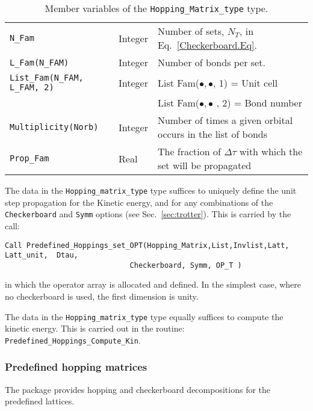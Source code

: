 \begin{table}[h]
\begin{tabular}{@{} l l l @{}}
      \texttt{N\_Fam}                &  Integer  &      Number of  sets, $N_T$, in Eq.~\eqref{Checkerboard.Eq}.   \\
      \texttt{L\_Fam(N\_FAM)}  &  Integer &       Number of bonds per  set.   \\    
      \texttt{List\_Fam(N\_FAM, L\_FAM, 2)}     &  Integer  &   List Fam($ \bullet,\bullet $, 1) =  Unit cell \\
                                              &                        &          List Fam($\bullet,\bullet$ , 2) =   Bond number \\
       \texttt{Multiplicity(Norb)} & Integer           &        Number of  times a  given orbital  occurs in the list of bonds  \\
       \texttt{Prop\_Fam} &  Real            &         The fraction of $ \Delta \tau $   with which the set will be propagated   \                                
        \\\bottomrule
   \end{tabular}
   \caption{Member variables of the \texttt{Hopping\_Matrix\_type}  type.   
    \label{table:Hopping_matrix}}
\end{table}

The  data in the \texttt{Hopping\_matrix\_type} type suffices to uniquely define the  unit step propagation    for the Kinetic energy, and for  any combinations of the  \texttt{Checkerboard} and  \texttt{Symm}  options (see Sec.~\ref{sec:trotter}).   This is carried  by the call: 
\begin{lstlisting}[style=fortran]
Call Predefined_Hoppings_set_OPT(Hopping_Matrix,List,Invlist,Latt,  Latt_unit,  Dtau, 
                             Checkerboard, Symm, OP_T )
\end{lstlisting}
in which  the  operator   array     is  allocated and defined.    In the simplest  case, where no  checkerboard is  used, the  first dimension  is  unity. 

The   data in  the \texttt{Hopping\_matrix\_type} type   equally  suffices to compute  the kinetic energy.  This is carried out in the routine:  \texttt{Predefined\_Hoppings\_Compute\_Kin}.




\subsubsection{Predefined hopping  matrices}
The package  provides hopping   and  checkerboard decompositions for   the predefined lattices.   
 
